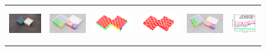 \begin{figure}[t!]  %
  \begin{centering} 
    \begin{tabular}{p{}p{}p{}p{}p{}p{}}
    \includegraphics[height=1.5cm]{figures/scene1/image_before.jpg}
&    \includegraphics[height=1.5cm]{figures/scene1/pcl_before.png}
&    \includegraphics[height=1.5cm]{figures/scene1/segments.png}
&    \includegraphics[height=1.5cm]{figures/scene1/labels.png}
&    \includegraphics[height=1.5cm]{figures/scene1/pcl_after.png}    
&    \includegraphics[height=1.5cm]{figures/scene1/distances.png}\\


\end{tabular}
\end{centering}
\end{figure}
